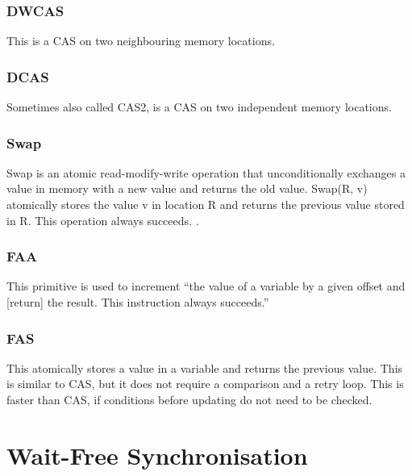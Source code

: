\subsubsection{\ac{DWCAS}}\label{subsubsec:double-compare-and-swap}
This is a \ac{CAS} on two neighbouring memory locations. \cite{Fuchs2014EvaluationOT}

\subsubsection{\ac{DCAS}}\label{subsubsec:double-with-compare-and-swap}
Sometimes also called \ac{CAS}2, is a \ac{CAS} on two independent memory locations. \cite{Fuchs2014EvaluationOT}

\subsubsection{Swap}\label{subsubsec:swap}
Swap is an atomic read-modify-write operation that unconditionally exchanges a value in memory with a new value and returns the old value. Swap(R, v) atomically stores the value v in location R and returns the previous value stored in R. This operation always succeeds. \cite{Mateíspmc}.

\subsubsection{\acf{FAA}}\label{subsubsec:fetch-and-add}
This primitive is used to increment \enquote{the value of a variable by a given offset and [return] the result. This instruction always succeeds.} \cite{Fuchs2014EvaluationOT}

\subsubsection{\ac{FAS}}\label{subsubsec:fetch-and-store}
This atomically stores a value in a variable and returns the previous value. This is similar to \ac{CAS}, but it does not require a comparison and a retry loop. This is faster than \ac{CAS}, if conditions before updating do not need to be checked. \cite{Drescher2015GuardedSections}

\section{Wait-Free Synchronisation}\label{sec:wait-free}

